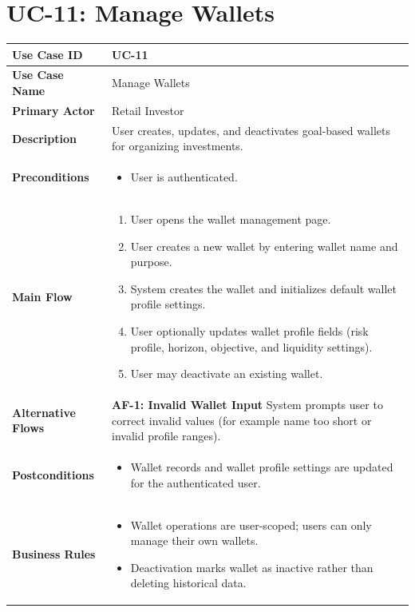 \section{UC-11: Manage Wallets}
\label{uc:manage-wallets}

\begin{longtable}{|>{\raggedright\arraybackslash\bfseries}p{3.5cm}|p{11cm}|}
\hline
\rowcolor{gray!15} Use Case ID & UC-11 \\ \hline
Use Case Name & Manage Wallets \\ \hline
Primary Actor & Retail Investor \\ \hline
Description & User creates, updates, and deactivates goal-based wallets for organizing investments. \\ \hline
Preconditions &
\begin{itemize}[leftmargin=*, nosep]
    \item User is authenticated.
\end{itemize} \\ \hline
Main Flow &
\begin{enumerate}[leftmargin=*, nosep]
    \item User opens the wallet management page.
    \item User creates a new wallet by entering wallet name and purpose.
    \item System creates the wallet and initializes default wallet profile settings.
    \item User optionally updates wallet profile fields (risk profile, horizon, objective, and liquidity settings).
    \item User may deactivate an existing wallet.
\end{enumerate} \\ \hline
Alternative Flows &
\textbf{AF-1: Invalid Wallet Input} \newline
System prompts user to correct invalid values (for example name too short or invalid profile ranges). \\ \hline
Postconditions &
\begin{itemize}[leftmargin=*, nosep]
    \item Wallet records and wallet profile settings are updated for the authenticated user.
\end{itemize} \\ \hline
Business Rules &
\begin{itemize}[leftmargin=*, nosep]
    \item Wallet operations are user-scoped; users can only manage their own wallets.
    \item Deactivation marks wallet as inactive rather than deleting historical data.
\end{itemize} \\ \hline
\end{longtable}

